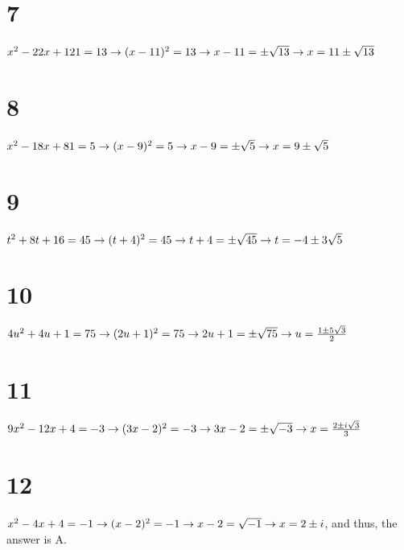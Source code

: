 \documentclass{article}
\theoremstyle{definition}
\begin{document}
\section*{7}
$x^2-22x+121=13\newline\rightarrow (x-11)^2=13\newline\rightarrow x-11=\pm \sqrt{13}\newline\rightarrow x=11\pm\sqrt{13}$

\section*{8}
$x^2-18x+81=5\newline\rightarrow (x-9)^2=5\newline\rightarrow x-9=\pm\sqrt{5}\newline\rightarrow x=9\pm\sqrt{5}$

\section*{9}
$t^2+8t+16=45\newline\rightarrow (t+4)^2=45\newline\rightarrow t+4=\pm\sqrt{45}\newline\rightarrow t=-4\pm 3\sqrt{5}$

\section*{10}
$4u^2+4u+1=75\newline\rightarrow (2u+1)^2=75\newline\rightarrow 2u+1=\pm\sqrt{75}\newline\rightarrow u=\frac{1\pm 5\sqrt{3}}{2}$

\section*{11}
$9x^2-12x+4=-3\newline\rightarrow (3x-2)^2=-3\newline\rightarrow 3x-2=\pm\sqrt{-3}\newline\rightarrow x=\frac{2\pm i\sqrt{3}}{3}$

\section*{12}
$x^2-4x+4=-1\newline\rightarrow (x-2)^2=-1\newline\rightarrow x-2=\sqrt{-1}\newline\rightarrow x=2\pm i$, and thus, the answer is A.
\end{document}
